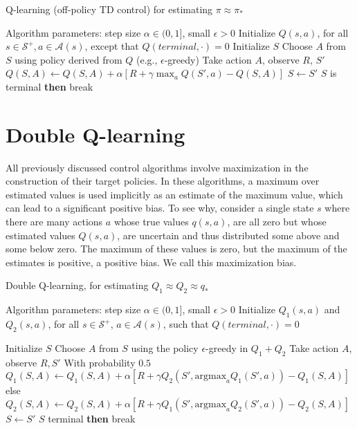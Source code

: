 \documentclass[12pt]{book}
\newcommand{\<}{\langle}
\renewcommand{\>}{\rangle}
\renewcommand{\S}{\mathcal{S}}
\newcommand{\A}{\mathcal{A}}
\begin{document}
\begin{algorithm}
\caption{Q-learning (off-policy TD control) for estimating $\pi \approx \pi_*$}
\begin{algorithmic}
\State Algorithm parameters: step size $\alpha\in (0,1]$, small $\epsilon > 0$
\State Initialize $Q(s,a)$, for all $s\in\S^+, a\in\A(s)$, except that $Q(terminal,\cdot)=0$ 
\medskip
{}
  \State Initialize $S$
    \State Choose $A$ from $S$ using policy derived from $Q$ (e.g., $\epsilon$-greedy)
    \State Take action $A$, observe $R$, $S'$
    \State $Q(S,A) \leftarrow Q(S,A) + \alpha [R + \gamma \max_a Q(S',a) - Q(S,A)]$
    \State $S\leftarrow S'$
     $S$ is terminal {\bf then} break
  \EndFor
\EndFor
\end{algorithmic}
\end{algorithm}

%
%
%

\section{Double Q-learning}

All previously discussed control algorithms involve maximization in the construction of their target policies. In these algorithms, a maximum over estimated values is used implicitly as an estimate of the maximum value, which can lead to a significant positive bias. To see why, consider a single state $s$ where there are many actions $a$ whose true values $q(s,a)$, are all zero but whose estimated values $Q(s,a)$, are uncertain and thus distributed some above and some below zero. The maximum of these values is zero, but the maximum of the estimates is positive, a positive bias. We call this maximization bias.

\begin{algorithm}
\caption{Double Q-learning, for estimating $Q_1 \approx Q_2 \approx q_*$}
\begin{algorithmic}
\State Algorithm parameters: step size $\alpha\in (0,1]$, small $\epsilon > 0$
\State Initialize $Q_1(s, a)$ and $Q_2(s, a)$, for all $s\in\S^+$, $a\in\A(s)$, such that $Q(terminal, \cdot)=0$

\medskip
{}
  \State Initialize $S$
    \State Choose $A$ from $S$ using the policy $\epsilon$-greedy in $Q_1 + Q_2$
    \State Take action $A$, observe $R,S'$
    \State With probability $0.5$
    \State \quad $Q_1(S,A)\leftarrow Q_1(S,A) + \alpha [ R + \gamma Q_2(S',\mathrm{argmax}_a Q_1(S',a)) - Q_1(S,A) ]$
    \State else
    \State \quad $Q_2(S,A)\leftarrow Q_2(S,A) + \alpha [ R + \gamma Q_1(S',\mathrm{argmax}_a Q_2(S',a)) - Q_2(S,A) ]$
    \State $S\leftarrow S'$
     $S$ terminal {\bf then} break
  \EndFor
\EndFor
\end{algorithmic}
\end{algorithm}
\end{document}
